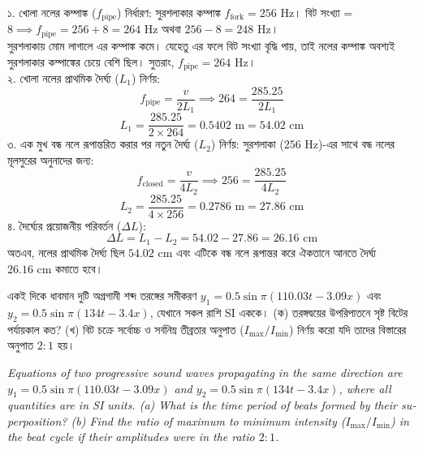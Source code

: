 \documentclass[12pt, a4paper]{article}
\begin{document}
\vspace{1em}

\begin{tcolorbox}[solutionbox={সমাধান (Solution)}]
\noindent
১. খোলা নলের কম্পাঙ্ক ($f_{\text{pipe}}$) নির্ধারণ: সুরশলাকার কম্পাঙ্ক $f_{\text{fork}} = 256\text{ Hz}$। বিট সংখ্যা = $8 \implies f_{\text{pipe}} = 256 + 8 = 264\text{ Hz}$ অথবা $256 - 8 = 248\text{ Hz}$। \\
সুরশলাকায় মোম লাগালে এর কম্পাঙ্ক কমে। যেহেতু এর ফলে বিট সংখ্যা বৃদ্ধি পায়, তাই নলের কম্পাঙ্ক অবশ্যই সুরশলাকার কম্পাঙ্কের চেয়ে বেশি ছিল। সুতরাং, $f_{\text{pipe}} = 264\text{ Hz}$। \\
২. খোলা নলের প্রাথমিক দৈর্ঘ্য ($L_1$) নির্ণয়:
\[ f_{\text{pipe}} = \frac{v}{2 L_1} \implies 264 = \frac{285.25}{2 L_1} \]
\[ L_1 = \frac{285.25}{2 \times 264} = 0.5402\text{ m} = 54.02\text{ cm} \]
৩. এক মুখ বন্ধ নলে রূপান্তরিত করার পর নতুন দৈর্ঘ্য ($L_2$) নির্ণয়: সুরশলাকা ($256\text{ Hz}$)-এর সাথে বন্ধ নলের মূলসুরের অনুনাদের জন্য:
\[ f_{\text{closed}} = \frac{v}{4 L_2} \implies 256 = \frac{285.25}{4 L_2} \]
\[ L_2 = \frac{285.25}{4 \times 256} = 0.2786\text{ m} = 27.86\text{ cm} \]
৪. দৈর্ঘ্যের প্রয়োজনীয় পরিবর্তন ($\Delta L$):
\[ \Delta L = L_1 - L_2 = 54.02 - 27.86 = 26.16\text{ cm} \]
অতএব, নলের প্রাথমিক দৈর্ঘ্য ছিল $54.02\text{ cm}$ এবং এটিকে বন্ধ নলে রূপান্তর করে ঐকতানে আনতে দৈর্ঘ্য $26.16\text{ cm}$ কমাতে হবে।
\end{tcolorbox}
\begin{tcolorbox}[questionbox={প্রশ্ন (Question) 6}]
\noindent
একই দিকে ধাবমান দুটি অগ্রগামী শব্দ তরঙ্গের সমীকরণ $y_1 = 0.5 \sin \pi(110.03t - 3.09x)$ এবং $y_2 = 0.5 \sin \pi(134t - 3.4x)$, যেখানে সকল রাশি SI এককে। (ক) তরঙ্গদ্বয়ের উপরিপাতনে সৃষ্ট বিটের পর্যায়কাল কত? (খ) বিট চক্রে সর্বোচ্চ ও সর্বনিম্ন তীব্রতার অনুপাত ($I_{\max} / I_{\min}$) নির্ণয় করো যদি তাদের বিস্তারের অনুপাত $2:1$ হয়।

\vspace{0.8em}
\begin{english}
\noindent\textit{\color{darkgray}
Equations of two progressive sound waves propagating in the same direction are $y_1 = 0.5 \sin \pi(110.03t - 3.09x)$ and $y_2 = 0.5 \sin \pi(134t - 3.4x)$, where all quantities are in SI units. (a) What is the time period of beats formed by their superposition? (b) Find the ratio of maximum to minimum intensity ($I_{\max} / I_{\min}$) in the beat cycle if their amplitudes were in the ratio $2:1$.
}
\end{english}
\end{tcolorbox}
\end{document}
